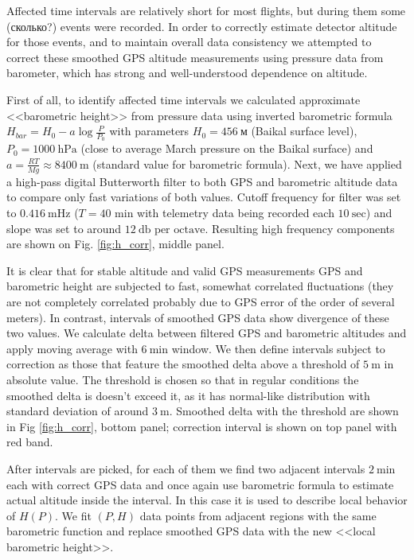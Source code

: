 \documentclass[final,5p,times,twocolumn]{elsarticle}
\begin{document}
Affected time intervals are relatively short for most flights, but during them some (сколько?) events were recorded. In order to correctly estimate detector altitude for those events, and to maintain overall data consistency we attempted to correct these smoothed GPS altitude measurements using pressure data from barometer, which has strong and well-understood dependence on altitude.

First of all, to identify affected time intervals we calculated approximate <<barometric height>> from pressure data using inverted barometric formula $H_{bar} = H_0 - a \log \frac{P}{P_0}$ with parameters $H_0 = 456~\textrm{м}$ (Baikal surface level), $P_0 = 1000~\textrm{hPa}$ (close to average March pressure on the Baikal surface) and $a = \frac{RT}{Mg} \approx 8400~\textrm{m}$ (standard value for barometric formula). Next, we have applied a high-pass digital Butterworth filter to both GPS and barometric altitude data to compare only fast variations of both values. Cutoff frequency for filter was set to $0.416~\textrm{mHz}$ ($T=40$ min with telemetry data being recorded each $10~\textrm{sec}$) and slope was set to around $12~\textrm{db per octave}$. Resulting high frequency components are shown on Fig. \ref{fig:h_corr}, middle panel.

It is clear that for stable altitude and valid GPS measurements GPS and barometric height are subjected to fast, somewhat correlated fluctuations (they are not completely correlated probably due to GPS error of the order of several meters). In contrast, intervals of smoothed GPS data show divergence of these two values. We calculate delta between filtered GPS and barometric altitudes and apply moving average with $6~\textrm{min}$ window. We then define intervals subject to correction as those that feature the smoothed delta above a threshold of $5~\textrm{m}$ in absolute value. The threshold is chosen so that in regular conditions the smoothed delta is doesn't exceed it, as it has normal-like distribution with standard deviation of around $3~\textrm{m}$. Smoothed delta with the threshold are shown in Fig \ref{fig:h_corr}, bottom panel; correction interval is shown on top panel with red band.

After intervals are picked, for each of them we find two adjacent intervals $2~\textrm{min}$ each with correct GPS data and once again use barometric formula to estimate actual altitude inside the interval. In this case it is used to describe local behavior of $H(P)$. We fit $(P, H)$ data points from adjacent regions with the same barometric function and replace smoothed GPS data with the new <<local barometric height>>.
\end{document}
